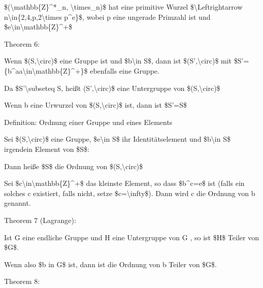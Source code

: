 \documentclass[a4paper]{article}
\begin{document}
\begin{multicols}{3}
\begin{itemize*}
            \begin{itemize*}
                  \item \$(\textbackslash mathbb\{Z\}\^{}*\_n, \textbackslash times\_n)\$ hat eine primitive Wurzel \$\textbackslash Leftrightarrow n\textbackslash in\{2,4,p,2\textbackslash times p\^{}e\}\$, wobei p eine ungerade Primzahl ist und \$e\textbackslash in\textbackslash mathbb\{Z\}\^{}+\$
            \end{itemize*}
            \item
            Theorem 6:

            \begin{itemize*}
                  \item Wenn \$(S,\textbackslash circ)\$ eine Gruppe ist und \$b\textbackslash in S\$, dann ist \$(S',\textbackslash circ)\$ mit \$S'=\{b\^{}a\textbar a\textbackslash in\textbackslash mathbb\{Z\}\^{}+\}\$ ebenfalls eine Gruppe.
                  \item Da \$S'\textbackslash subseteq S, heißt (S',\textbackslash circ)\$ eine Untergruppe von \$(S,\textbackslash circ)\$
                  \item Wenn b eine Urwurzel von \$(S,\textbackslash circ)\$ ist, dann ist \$S'=S\$
            \end{itemize*}
            \item
            Definition: Ordnung einer Gruppe und eines Elements

            \begin{itemize*}
                  \item Sei \$(S,\textbackslash circ)\$ eine Gruppe, \$e\textbackslash in S\$ ihr Identitätselement und \$b\textbackslash in S\$ irgendein Element von \$S\$:
                  \begin{itemize*} \item Dann heiße \$\textbar S\textbar\$ die Ordnung von \$(S,\textbackslash circ)\$ \item Sei \$c\textbackslash in\textbackslash mathbb\{Z\}\^{}+\$ das kleinste Element, so dass \$b\^{}c=e\$ ist (falls ein solches c existiert, falls nicht, setze \$c=\textbackslash infty\$). Dann wird c die Ordnung von b genannt. \end{itemize*}
            \end{itemize*}
            \item
            Theorem 7 (Lagrange):

            \begin{itemize*}
                  \item Ist G eine endliche Gruppe und H eine Untergruppe von G , so ist \$\textbar H\textbar\$ Teiler von \$\textbar G\textbar\$.
                  \item Wenn also \$b in G\$ ist, dann ist die Ordnung von b Teiler von \$\textbar G\textbar\$.
            \end{itemize*}
            \item
            Theorem 8:


\end{itemize*}
\end{multicols}
\end{document}
